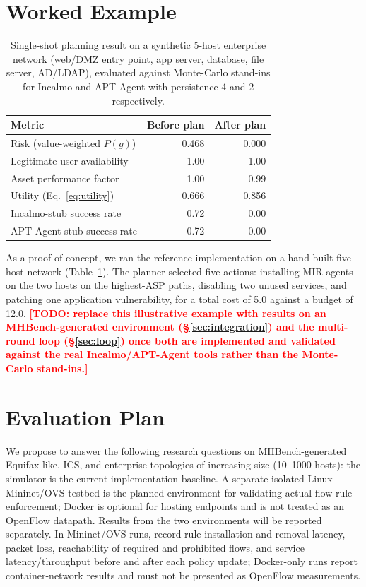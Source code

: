 \documentclass[conference]{IEEEtran}
\newcommand{\todo}[1]{\textcolor{red}{\textbf{[TODO: #1]}}}
\begin{document}
\section{Worked Example}
\label{sec:case-study}

\begin{table}[t]
\centering
\caption{Single-shot planning result on a synthetic 5-host enterprise network
(web/DMZ entry point, app server, database, file server, AD/LDAP), evaluated against
Monte-Carlo stand-ins for Incalmo and APT-Agent with persistence 4 and 2 respectively.}
\label{tab:casestudy}
\begin{tabular}{@{}lrr@{}}
\toprule
Metric & Before plan & After plan \\
\midrule
Risk (value-weighted $P(g)$) & 0.468 & 0.000 \\
Legitimate-user availability & 1.00 & 1.00 \\
Asset performance factor & 1.00 & 0.99 \\
Utility (Eq.~\ref{eq:utility}) & 0.666 & 0.856 \\
Incalmo-stub success rate & 0.72 & 0.00 \\
APT-Agent-stub success rate & 0.72 & 0.00 \\
\bottomrule
\end{tabular}
\end{table}

As a proof of concept, we ran the reference implementation on a hand-built
five-host network (Table~\ref{tab:casestudy}). The planner selected five actions:
installing MIR agents on the two hosts on the highest-ASP paths, disabling two
unused services, and patching one application vulnerability, for a total cost of
5.0 against a budget of 12.0. \todo{replace this illustrative example with
results on an MHBench-generated environment (\S\ref{sec:integration}) and the
multi-round loop (\S\ref{sec:loop}) once both are implemented and validated against
the real Incalmo/APT-Agent tools rather than the Monte-Carlo stand-ins.}

\section{Evaluation Plan}
\label{sec:evaluation}

We propose to answer the following research questions on MHBench-generated
Equifax-like, ICS, and enterprise topologies of increasing size (10--1000 hosts):
the simulator is the current implementation baseline. A separate isolated Linux
Mininet/OVS testbed is the planned environment for validating actual flow-rule
enforcement; Docker is optional for hosting endpoints and is not treated as an
OpenFlow datapath. Results from the two environments will be reported separately.
In Mininet/OVS runs, record rule-installation and removal latency, packet loss,
reachability of required and prohibited flows, and service latency/throughput before
and after each policy update; Docker-only runs report container-network results and
must not be presented as OpenFlow measurements.
\end{document}
